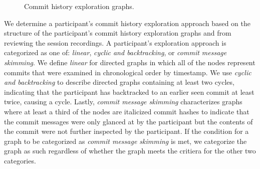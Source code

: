 \begin{figure}[h]
  \centering%
  \qquad
  \caption{
    Commit history exploration graphs.
  }%
  \label{fig:Exploration-Graphs}%
\end{figure}

We determine a participant's commit history exploration approach based on the structure 
of the participant's commit history exploration graphs and from reviewing the session recordings.
A participant's exploration approach is categorized as one of:
\textit{linear}, \textit{cyclic and backtracking}, or \textit{commit message skimming}.
We define \textit{linear} for directed graphs in which all of the nodes represent commits 
that were examined in chronological order by timestamp. 
We use \textit{cyclic and backtracking} to describe directed graphs 
containing at least two cycles, indicating that the participant has backtracked to
an earlier seen commit at least twice, causing a cycle. 
Lastly, \textit{commit message skimming} characterizes graphs where 
at least a third of the nodes are italicized commit hashes to indicate
that the commit messages were only glanced at by the participant but the
contents of the commit were not further inspected by the participant.
If the condition for a graph to be categorized as \textit{commit message skimming} is met,
we categorize the graph as such regardless of whether the graph meets the critiera for the other two categories.

